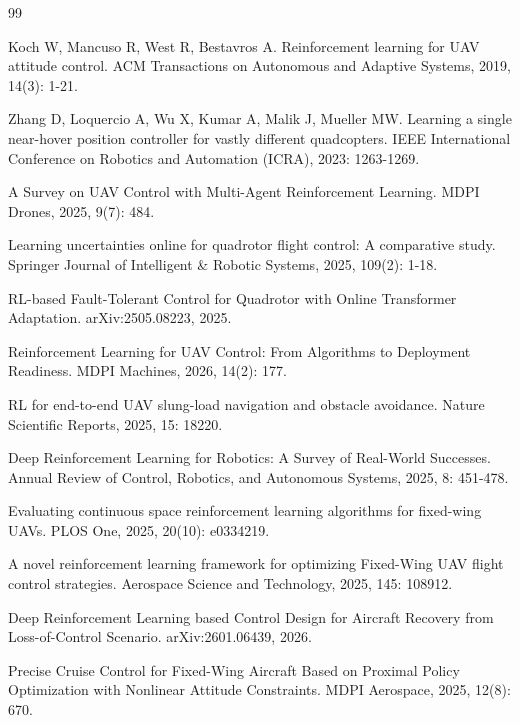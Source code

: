 \documentclass[12pt,a4paper]{ctexart}
\begin{document}
\begin{thebibliography}{99}

 Koch W, Mancuso R, West R, Bestavros A. Reinforcement learning for UAV attitude control. ACM Transactions on Autonomous and Adaptive Systems, 2019, 14(3): 1-21.

 Zhang D, Loquercio A, Wu X, Kumar A, Malik J, Mueller MW. Learning a single near-hover position controller for vastly different quadcopters. IEEE International Conference on Robotics and Automation (ICRA), 2023: 1263-1269.

 A Survey on UAV Control with Multi-Agent Reinforcement Learning. MDPI Drones, 2025, 9(7): 484.

 Learning uncertainties online for quadrotor flight control: A comparative study. Springer Journal of Intelligent \& Robotic Systems, 2025, 109(2): 1-18.

 RL-based Fault-Tolerant Control for Quadrotor with Online Transformer Adaptation. arXiv:2505.08223, 2025.

 Reinforcement Learning for UAV Control: From Algorithms to Deployment Readiness. MDPI Machines, 2026, 14(2): 177.

 RL for end-to-end UAV slung-load navigation and obstacle avoidance. Nature Scientific Reports, 2025, 15: 18220.

 Deep Reinforcement Learning for Robotics: A Survey of Real-World Successes. Annual Review of Control, Robotics, and Autonomous Systems, 2025, 8: 451-478.

 Evaluating continuous space reinforcement learning algorithms for fixed-wing UAVs. PLOS One, 2025, 20(10): e0334219.

 A novel reinforcement learning framework for optimizing Fixed-Wing UAV flight control strategies. Aerospace Science and Technology, 2025, 145: 108912.

 Deep Reinforcement Learning based Control Design for Aircraft Recovery from Loss-of-Control Scenario. arXiv:2601.06439, 2026.

 Precise Cruise Control for Fixed-Wing Aircraft Based on Proximal Policy Optimization with Nonlinear Attitude Constraints. MDPI Aerospace, 2025, 12(8): 670.


\end{thebibliography}
\end{document}
